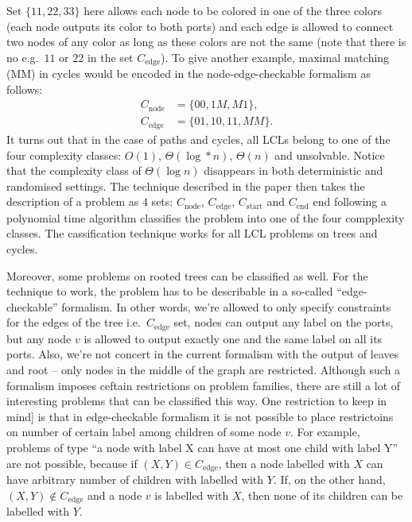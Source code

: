 Set $\{ 11, 22, 33 \}$ here allows each node to be colored in one of the three colors
(each node outputs its color to both ports) and each edge is allowed to connect
two nodes of any color as long as these colors are not the same (note that there is no
e.g.\ $11$ or $22$ in the set $C_{\textrm{edge}}$). To give another example, maximal matching (MM) in cycles
would be encoded in the node-edge-checkable formalism as follows:
\begin{align*}
C_{\textrm{node}} &= \{ 00, 1M, M1 \}, \\
C_{\textrm{edge}} &= \{ 01, 10, 11, MM \}.
\end{align*}
It turns out that in the case of paths and cycles, all LCLs belong to one of the four
complexity classes: $O(1)$, $\Theta(\log* n)$, $\Theta(n)$ and unsolvable. Notice that
the complexity class of $\Theta(\log n)$ disappears in both deterministic and randomised settings.
The technique described in the paper then takes the description of a problem as 4 sets: $C_{\textrm{node}}$,
$C_{\textrm{edge}}$, $C_{\textrm{start}}$ and $C_{\textrm{end}}$ end following a polynomial time algorithm classifies the
problem into one of the four compplexity classes. The cassification technique works for all LCL
problems on trees and cycles.

Moreover, some problems on rooted trees can be classified as well. For the technique to work, the problem
has to be describable in a so-called ``edge-checkable'' formalism. In other words, we're allowed to
only specify constraints for the edges of the tree i.e.\ $C_{\textrm{edge}}$ set, nodes can output any label
on the ports, but any node $v$ is allowed to output exactly one and the same label on all its ports.
Also, we're not concert in the current formalism with the output of leaves and root -- only nodes in the
middle of the graph are restricted. Although such a formalism imposes ceftain restrictions on problem families,
there are still a lot of interesting problems that can be classified this way. One restriction to keep in mind]
is that in edge-checkable formalism it is not possible to place restrictoins on number of certain label
among children of some node $v$. For example, problems of type ``a node with label X can have at most one child with label Y''
are not possible, because if $(X, Y) \in C_{\textrm{edge}}$, then a node labelled with $X$ can have arbitrary number of children
with labelled with $Y$. If, on the other hand, $(X, Y) \notin C_{\textrm{edge}}$ and a node $v$ is labelled with $X$, then
none of its children can be labelled with $Y$.

